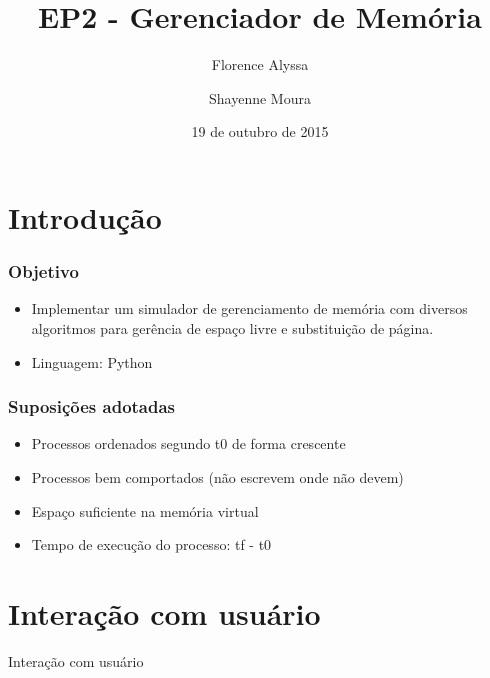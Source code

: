 \documentclass{beamer}
\title{EP2 - Gerenciador de Memória} %
\author{Florence Alyssa \and Shayenne Moura} %
\institute[USP] %
{
Sistemas Operacionais
 \\ Bacharelado em Ciência da Computação%
\medskip
\textit{} %
}
\date{19 de outubro de 2015} %
\begin{document}
\begin{frame}
\titlepage %
\end{frame}


\section{Introdução} 
\begin{frame}
\frametitle{Objetivo}
\begin{itemize}
\item Implementar um simulador de gerenciamento de memória com diversos algoritmos para gerência de espaço livre e substituição de página.
\newline

\item Linguagem: Python
\end{itemize}

\end{frame}

\begin{frame}
\frametitle{Suposições adotadas}
\begin{itemize}
\item Processos ordenados segundo t0 de forma crescente
\item Processos bem comportados (não escrevem onde não devem)
\item Espaço suficiente na memória virtual
\item Tempo de execução do processo: tf - t0
\end{itemize}
\end{frame}


\section{Interação com usuário}
\begin{frame}
\begin{LARGE}
\begin{center}
Interação com usuário
\end{center}
\end{LARGE}
\end{frame}
\end{document}
